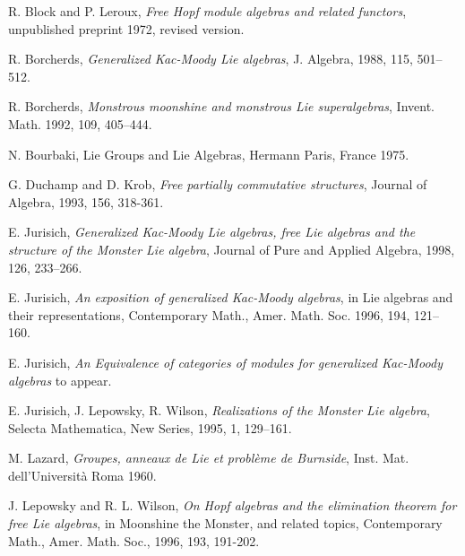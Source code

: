 \documentclass[11pt]{amsart}
\theoremstyle{definition}
\begin{document}
\begin{thebibliography}{99}





  R. Block and P. Leroux,
\emph{Free Hopf module algebras and related functors},
 unpublished preprint
 1972,
 revised version.


  R. Borcherds,
 \emph{Generalized Kac-Moody Lie algebras},
 J. Algebra,  1988,
 115, 501--512.


 R. Borcherds,
 \emph{Monstrous moonshine and monstrous Lie superalgebras},
 Invent. Math. 1992,
 109,  405--444.


N. Bourbaki,
 Lie Groups and Lie Algebras,
 Hermann
 Paris, France
 1975.



  G. Duchamp and D. Krob,
 \emph{Free partially commutative structures},
   Journal of Algebra,
   1993,   156,   318-361.


  E. Jurisich,
 \emph{Generalized Kac-Moody Lie algebras, free Lie algebras
and the structure of the Monster Lie algebra},
Journal of Pure and Applied Algebra, 1998, 126, 233--266.


 E. Jurisich,
\emph{An exposition of generalized Kac-Moody algebras}, in
 Lie algebras and their representations, Contemporary Math., Amer. Math. Soc.
1996,
 194, 121--160.
 

 E. Jurisich,
\emph{An Equivalence of categories of modules for generalized
Kac-Moody algebras}
to appear.




  E. Jurisich, J. Lepowsky, R. Wilson,
\emph{Realizations of the Monster Lie algebra},
Selecta Mathematica, New Series, 1995, 1,  129--161.


 M. Lazard,
\emph{Groupes, anneaux de Lie et probl\`{e}me de Burnside},
 Inst. Mat. dell'Universit\`{a} Roma
 1960.


J. Lepowsky and R. L. Wilson,
\emph{On Hopf algebras and the elimination theorem for free Lie algebras}, in
Moonshine the Monster, and related topics, Contemporary Math.,  Amer. Math. Soc., 1996,
 193,
 191-202.


\end{thebibliography}
\end{document}

